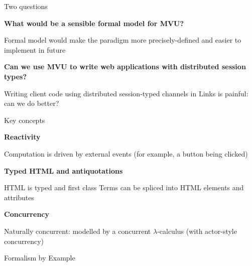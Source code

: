 \documentclass[11.5pt, aspectratio=169]{beamer}
\begin{document}
\begin{frame}{Two questions}
  \begin{fullpageitemize}
  \item {\Large \textbf{What would be a sensible formal model for MVU?}}
    \begin{itemize}
      \itemR Formal model would make the paradigm more precisely-defined and easier to implement in future
    \end{itemize}
    \vspace{1em}
  \item {\Large \textbf{Can we use MVU to write web applications with distributed session types?}}
    \begin{itemize}
      \itemR Writing client code using distributed session-typed channels in Links is painful: can we do better?
    \end{itemize}
  \end{fullpageitemize}
\end{frame}


\begin{frame}{Key concepts}

  \begin{fullpageitemize}
  \item {\Large \textbf{Reactivity}}
    \begin{itemize}
      \itemR Computation is driven by external events (for example, a button being clicked)
    \end{itemize}
    \vspace{0.5em}
  \item {\Large \textbf{Typed HTML and antiquotations}}
    \begin{itemize}
      \itemR HTML is typed and first class
      \itemR Terms can be spliced into HTML elements and attributes
    \end{itemize}
    \vspace{0.5em}
  \item {\Large \textbf{Concurrency}}
    \begin{itemize}
      \itemR Naturally concurrent: modelled by a concurrent $\lambda$-calculus (with actor-style concurrency)
    \end{itemize}
  \end{fullpageitemize}
\end{frame}

\begin{frame}{Formalism by Example}

\end{frame}
\end{document}
